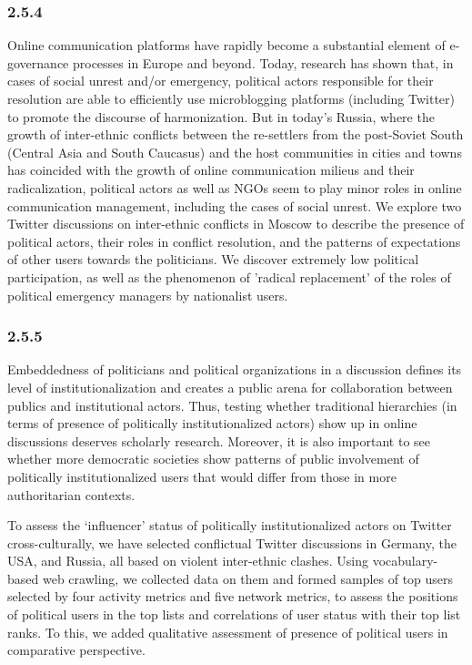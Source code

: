 \subsubsection{2.5.4}

Online communication platforms have rapidly become a substantial element of e-governance processes in Europe and beyond. Today, research has shown that, in cases of social unrest and/or emergency, political actors responsible for their resolution are able to efficiently use microblogging platforms (including Twitter) to promote the discourse of harmonization. But in today's Russia, where the growth of inter-ethnic conflicts between the re-settlers from the post-Soviet South (Central Asia and South Caucasus) and the host communities in cities and towns has coincided with the growth of online communication milieus and their radicalization, political actors as well as NGOs seem to play minor roles in online communication management, including the cases of social unrest. We explore two Twitter discussions on inter-ethnic conflicts in Moscow to describe the presence of political actors, their roles in conflict resolution, and the patterns of expectations of other users towards the politicians. We discover extremely low political participation, as well as the phenomenon of 'radical replacement' of the roles of political emergency managers by nationalist users.

\subsubsection{2.5.5}

Embeddedness of politicians and political organizations in a discussion defines its level of institutionalization and creates a public arena for collaboration between publics and institutional actors. Thus, testing whether traditional hierarchies (in terms of presence of politically institutionalized actors) show up in online discussions deserves scholarly research. Moreover, it is also important to see whether more democratic societies show patterns of public involvement of politically institutionalized users that would differ from those in more authoritarian contexts.

To assess the ‘influencer’ status of politically institutionalized actors on Twitter cross-culturally, we have selected conflictual Twitter discussions in Germany, the USA, and Russia, all based on violent inter-ethnic clashes. Using vocabulary-based web crawling, we collected data on them and formed samples of top users selected by four activity metrics and five network metrics, to assess the positions of political users in the top lists and correlations of user status with their top list ranks. To this, we added qualitative assessment of presence of political users in comparative perspective.

